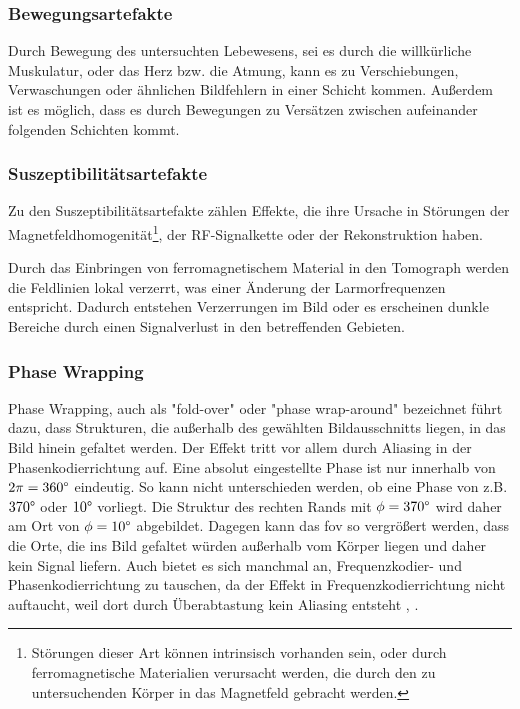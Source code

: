 \subsubsection{Bewegungsartefakte}
Durch Bewegung des untersuchten Lebewesens, sei es durch die willkürliche Muskulatur, oder das Herz bzw. die Atmung, kann es zu Verschiebungen, Verwaschungen oder ähnlichen Bildfehlern in einer Schicht kommen. Außerdem ist es möglich, dass es durch Bewegungen zu Versätzen zwischen aufeinander folgenden Schichten kommt.                       

\subsubsection{Suszeptibilitätsartefakte}
Zu den Suszeptibilitätsartefakte zählen Effekte, die ihre Ursache in Störungen der Magnetfeldhomogenität\footnote{Störungen dieser Art können intrinsisch vorhanden sein, oder durch ferromagnetische Materialien verursacht werden, die durch den zu untersuchenden Körper in das Magnetfeld gebracht werden.}, der RF-Signalkette oder der Rekonstruktion haben.

Durch das Einbringen von ferromagnetischem Material in den Tomograph werden die Feldlinien lokal verzerrt, was einer Änderung der Larmorfrequenzen entspricht. Dadurch entstehen Verzerrungen im Bild oder es erscheinen dunkle Bereiche durch einen Signalverlust in den betreffenden Gebieten.

\subsubsection{Phase Wrapping}
Phase Wrapping, auch als "fold-over" oder "phase wrap-around" bezeichnet führt dazu, dass Strukturen, die außerhalb des gewählten Bildausschnitts liegen, in das Bild hinein gefaltet werden. Der Effekt tritt vor allem durch Aliasing in der Phasenkodierrichtung auf. Eine absolut eingestellte Phase ist nur innerhalb von $2\pi = 360\degree$ eindeutig. So kann nicht unterschieden werden, ob eine Phase von z.B. $370\degree$ oder $10\degree$ vorliegt. Die Struktur des rechten Rands mit $\phi = 370\degree$ wird daher am Ort von $\phi = 10\degree$ abgebildet. Dagegen kann das \gls{fov} so vergrößert werden, dass die Orte, die ins Bild gefaltet würden außerhalb vom Körper liegen und daher kein Signal liefern. Auch bietet es sich manchmal an, Frequenzkodier- und Phasenkodierrichtung zu tauschen, da der Effekt in Frequenzkodierrichtung nicht auftaucht, weil dort durch Überabtastung kein Aliasing entsteht \cite{Pusey1988}, \cite{Heiland2008}.

